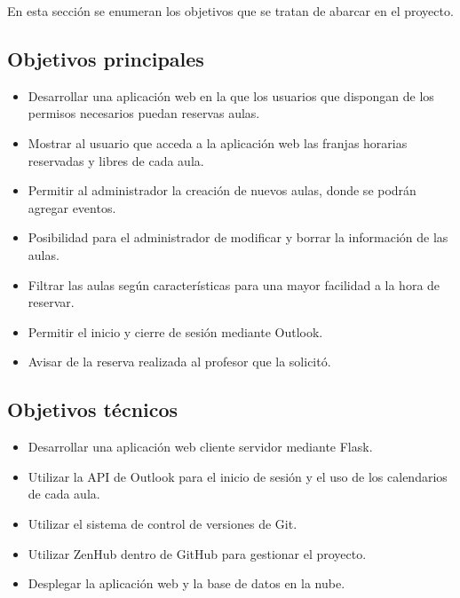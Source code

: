 
En esta sección se enumeran los objetivos que se tratan de abarcar en el proyecto.

\subsection{Objetivos principales}

\begin{itemize}
	\item Desarrollar una aplicación web en la que los usuarios que dispongan de los permisos necesarios puedan reservas aulas.
	\item Mostrar al usuario que acceda a la aplicación web las franjas horarias reservadas y libres de cada aula.
	\item Permitir al administrador la creación de nuevos aulas, donde se podrán agregar eventos.
	\item Posibilidad para el administrador de modificar y borrar la información de las aulas.
	\item Filtrar las aulas según características para una mayor facilidad a la hora de reservar.
	\item Permitir el inicio y cierre de sesión mediante Outlook.
	\item Avisar de la reserva realizada al profesor que la solicitó.
\end{itemize}

\subsection{Objetivos técnicos}
\begin{itemize}
	\item Desarrollar una aplicación web cliente servidor mediante Flask.
	\item Utilizar la API de Outlook para el inicio de sesión y el uso de los calendarios de cada aula.
	\item Utilizar el sistema de control de versiones de Git.
	\item Utilizar ZenHub dentro de GitHub para gestionar el proyecto.
	\item Desplegar la aplicación web y la base de datos en la nube.
\end{itemize}